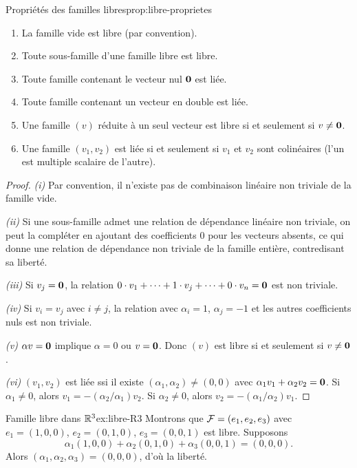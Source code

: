 \begin{proposition}{Propriétés des familles libres}{prop:libre-proprietes}
  \begin{enumerate}[label=(\roman*)]
    \item La famille vide est libre (par convention).
    \item Toute sous-famille d'une famille libre est libre.
    \item Toute famille contenant le vecteur nul $\mathbf{0}$ est liée.
    \item Toute famille contenant un vecteur en double est liée.
    \item Une famille $(v)$ réduite à un seul vecteur est libre si et
      seulement si $v\neq\mathbf{0}$.
    \item Une famille $(v_1,v_2)$ est liée si et seulement si $v_1$ et
      $v_2$ sont colinéaires (l'un est multiple scalaire de l'autre).
  \end{enumerate}
\end{proposition}

\begin{proof}
  \emph{(i)} Par convention, il n'existe pas de combinaison linéaire
  non triviale de la famille vide.

  \emph{(ii)} Si une sous-famille admet une relation de dépendance
  linéaire non triviale, on peut la compléter en ajoutant des
  coefficients $0$ pour les vecteurs absents, ce qui donne une relation
  de dépendance non triviale de la famille entière, contredisant sa
  liberté.

  \emph{(iii)} Si $v_j=\mathbf{0}$, la relation $0\cdot v_1+\cdots+1\cdot
  v_j+\cdots+0\cdot v_n=\mathbf{0}$ est non triviale.

  \emph{(iv)} Si $v_i=v_j$ avec $i\neq j$, la relation avec
  $\alpha_i=1$, $\alpha_j=-1$ et les autres coefficients nuls est non
  triviale.

  \emph{(v)} $\alpha v=\mathbf{0}$ implique $\alpha=0$ ou $v=\mathbf{0}$. Donc
  $(v)$ est libre si et seulement si $v\neq\mathbf{0}$.

  \emph{(vi)} $(v_1,v_2)$ est liée ssi il existe $(\alpha_1,\alpha_2)
  \neq(0,0)$ avec $\alpha_1 v_1+\alpha_2 v_2=\mathbf{0}$. Si $\alpha_1
  \neq 0$, alors $v_1=-(\alpha_2/\alpha_1)v_2$. Si $\alpha_2\neq 0$,
  alors $v_2=-(\alpha_1/\alpha_2)v_1$.
\end{proof}

\begin{example}{Famille libre dans ${\mathbb{R}}^3$}{ex:libre-R3}
  Montrons que ${\mathcal{F}}=(e_1,e_2,e_3)$ avec $e_1=(1,0,0)$, $e_2=(0,1,0)$,
  $e_3=(0,0,1)$ est libre. Supposons
  \[
    \alpha_1(1,0,0)+\alpha_2(0,1,0)+\alpha_3(0,0,1)=(0,0,0).
  \]
  Alors $(\alpha_1,\alpha_2,\alpha_3)=(0,0,0)$, d'où la liberté.
\end{example}

